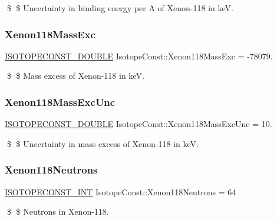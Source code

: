 \$ \$ Uncertainty in binding energy per A of Xenon-\/118 in keV. \mbox{\label{group___isotope_const-_xenon-_xe118_gafd5d265789a3a6c4a5d30cd727303a08}} 
\subsubsection{\texorpdfstring{Xenon118\+Mass\+Exc}{Xenon118MassExc}}
{\footnotesize\ttfamily \mbox{\hyperlink{group___isotope_const-_macros_ga8f45a7272ce02c0b4c65c44636ed719a}{I\+S\+O\+T\+O\+P\+E\+C\+O\+N\+S\+T\+\_\+\+D\+O\+U\+B\+LE}} Isotope\+Const\+::\+Xenon118\+Mass\+Exc = -\/78079.}

\$ \$ Mass excess of Xenon-\/118 in keV. \mbox{\label{group___isotope_const-_xenon-_xe118_gac97e3ac981676204fbefc6a67b132de4}} 
\subsubsection{\texorpdfstring{Xenon118\+Mass\+Exc\+Unc}{Xenon118MassExcUnc}}
{\footnotesize\ttfamily \mbox{\hyperlink{group___isotope_const-_macros_ga8f45a7272ce02c0b4c65c44636ed719a}{I\+S\+O\+T\+O\+P\+E\+C\+O\+N\+S\+T\+\_\+\+D\+O\+U\+B\+LE}} Isotope\+Const\+::\+Xenon118\+Mass\+Exc\+Unc = 10.}

\$ \$ Uncertainty in mass excess of Xenon-\/118 in keV. \mbox{\label{group___isotope_const-_xenon-_xe118_ga719f86ac7331b954dd779b4ba5bf387b}} 
\subsubsection{\texorpdfstring{Xenon118\+Neutrons}{Xenon118Neutrons}}
{\footnotesize\ttfamily \mbox{\hyperlink{group___isotope_const-_macros_ga5f18360b3e99483a35c32d789e62621c}{I\+S\+O\+T\+O\+P\+E\+C\+O\+N\+S\+T\+\_\+\+I\+NT}} Isotope\+Const\+::\+Xenon118\+Neutrons = 64}

\$ \$ Neutrons in Xenon-\/118. \mbox{\label{group___isotope_const-_xenon-_xe118_gafb4a71cb52c5a5f3f8e10a027ec31ee8}} 
